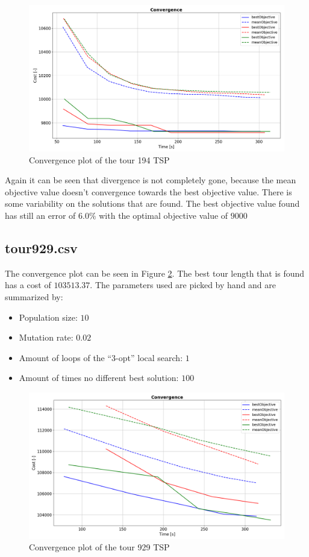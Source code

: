 \documentclass[a4paper,10pt]{article}
\begin{document}
\begin{figure}[h]
	\includegraphics[width=1.0\textwidth]{convergence_tour194.PNG}
	\caption{Convergence plot of the tour 194 TSP}
	\label{fig:convergence_tour194}
	\centering
\end{figure}

Again it can be seen that divergence is not completely gone, because the mean objective value doesn't convergence towards the best objective value. There is some variability on the solutions that are found. The best objective value found has still an error of $ 6.0 \% $ with the optimal objective value of $ 9000 $


\subsection{tour929.csv}
The convergence plot can be seen in Figure \ref{fig:convergence_tour9292}.
The best tour length that is found  has a cost of $  103513.37 $.
The parameters used are picked by hand and are summarized by: 
\begin{itemize}
	\item Population size: $ 10 $
	\item Mutation rate: $ 0.02 $
	\item Amount of loops of the ``3-opt'' local search: $ 1 $
	\item Amount of times no different best solution: $ 100 $ 
\end{itemize}


\begin{figure}[h]
	\includegraphics[width=1.0\textwidth]{convergence_tour9292.PNG}
	\caption{Convergence plot of the tour 929 TSP}
	\label{fig:convergence_tour9292}
	\centering
\end{figure}
\end{document}
